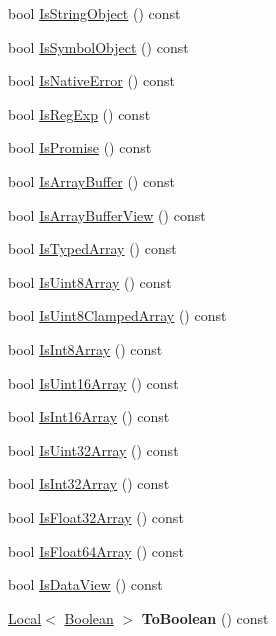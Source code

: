 \begin{DoxyCompactItemize}
\item 
bool \hyperlink{classv8_1_1Value_a3e0f2727455fd01a39a60b92f77e28e0}{Is\-String\-Object} () const 
\item 
bool \hyperlink{classv8_1_1Value_a867baa94cb8f1069452359e6cef6751e}{Is\-Symbol\-Object} () const 
\item 
bool \hyperlink{classv8_1_1Value_a579fb52e893cdc24f8b77e5acc77d06d}{Is\-Native\-Error} () const 
\item 
bool \hyperlink{classv8_1_1Value_aae41e43486937d6122c297a0d43ac0b8}{Is\-Reg\-Exp} () const 
\item 
bool \hyperlink{classv8_1_1Value_a93d6a0817b15a1d28050ba16e131e6b4}{Is\-Promise} () const 
\item 
bool \hyperlink{classv8_1_1Value_a65f9dad740f2468b44dc16349611c351}{Is\-Array\-Buffer} () const 
\item 
bool \hyperlink{classv8_1_1Value_ad54475d15b7e6b6e17fc80fb4570cdf2}{Is\-Array\-Buffer\-View} () const 
\item 
bool \hyperlink{classv8_1_1Value_ac2f2f6c39f14a39fbb5b43577125dfe4}{Is\-Typed\-Array} () const 
\item 
bool \hyperlink{classv8_1_1Value_acbe2cd9c9cce96ee498677ba37c8466d}{Is\-Uint8\-Array} () const 
\item 
bool \hyperlink{classv8_1_1Value_ad3cb464ab5ef0215bd2cbdd4eb2b7e3d}{Is\-Uint8\-Clamped\-Array} () const 
\item 
bool \hyperlink{classv8_1_1Value_a10a88a2794271dfcd9c3abd565e8f28a}{Is\-Int8\-Array} () const 
\item 
bool \hyperlink{classv8_1_1Value_a4a45fabf58b241f5de3086a3dd0a09ae}{Is\-Uint16\-Array} () const 
\item 
bool \hyperlink{classv8_1_1Value_a928c586639dd75ae4efdaa66b1fc4d50}{Is\-Int16\-Array} () const 
\item 
bool \hyperlink{classv8_1_1Value_a5e39229dc74d534835cf4ceba10676f4}{Is\-Uint32\-Array} () const 
\item 
bool \hyperlink{classv8_1_1Value_a48eac78a49c8b42d9f8cf05c514b3750}{Is\-Int32\-Array} () const 
\item 
bool \hyperlink{classv8_1_1Value_a4effc7ca1a221dd8c1e23c0f28145ef0}{Is\-Float32\-Array} () const 
\item 
bool \hyperlink{classv8_1_1Value_a293f140b81b0219d1497e937ed948b1e}{Is\-Float64\-Array} () const 
\item 
bool \hyperlink{classv8_1_1Value_afd20ab51e79658acc405c12dad2260ab}{Is\-Data\-View} () const 
\item 
\hypertarget{classv8_1_1Value_a73d653dc4a4999ce7258b40a4d8a1510}{\hyperlink{classv8_1_1Local}{Local}$<$ \hyperlink{classv8_1_1Boolean}{Boolean} $>$ {\bfseries To\-Boolean} () const }\label{classv8_1_1Value_a73d653dc4a4999ce7258b40a4d8a1510}


\end{DoxyCompactItemize}

